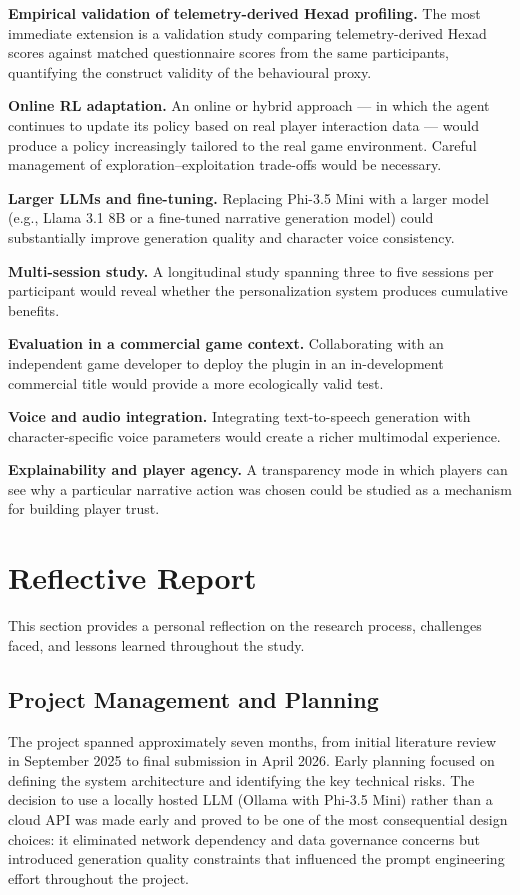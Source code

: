 \documentclass[12pt,a4paper]{report}
\begin{document}
\textbf{Empirical validation of telemetry-derived Hexad profiling.} The most immediate extension is a validation study comparing telemetry-derived Hexad scores against matched questionnaire scores from the same participants, quantifying the construct validity of the behavioural proxy.

\textbf{Online RL adaptation.} An online or hybrid approach --- in which the agent continues to update its policy based on real player interaction data --- would produce a policy increasingly tailored to the real game environment. Careful management of exploration--exploitation trade-offs would be necessary.

\textbf{Larger LLMs and fine-tuning.} Replacing Phi-3.5 Mini with a larger model (e.g., Llama 3.1 8B or a fine-tuned narrative generation model) could substantially improve generation quality and character voice consistency.

\textbf{Multi-session study.} A longitudinal study spanning three to five sessions per participant would reveal whether the personalization system produces cumulative benefits.

\textbf{Evaluation in a commercial game context.} Collaborating with an independent game developer to deploy the plugin in an in-development commercial title would provide a more ecologically valid test.

\textbf{Voice and audio integration.} Integrating text-to-speech generation with character-specific voice parameters would create a richer multimodal experience.

\textbf{Explainability and player agency.} A transparency mode in which players can see why a particular narrative action was chosen could be studied as a mechanism for building player trust.

\section{Reflective Report}

This section provides a personal reflection on the research process, challenges faced, and lessons learned throughout the study.

\subsection{Project Management and Planning}

The project spanned approximately seven months, from initial literature review in September 2025 to final submission in April 2026. Early planning focused on defining the system architecture and identifying the key technical risks. The decision to use a locally hosted LLM (Ollama with Phi-3.5 Mini) rather than a cloud API was made early and proved to be one of the most consequential design choices: it eliminated network dependency and data governance concerns but introduced generation quality constraints that influenced the prompt engineering effort throughout the project.
\end{document}

